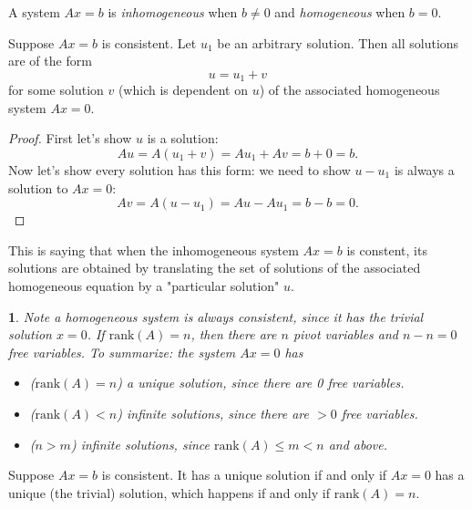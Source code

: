 \documentclass[12pt]{article}
\newtheorem{para}[theorem]{}
\begin{document}
\begin{definition}
	A system $Ax=b$ is \emph{inhomogeneous} when $b\neq 0$ and \emph{homogeneous} when $b=0$.
\end{definition}

\begin{proposition}
	Suppose $Ax=b$ is consistent. Let $u_1$ be an arbitrary solution. Then all solutions are of the form 
	\begin{equation*}
		u = u_1+v
	\end{equation*}
	for some solution $v$ (which is dependent on $u$) of the associated homogeneous system $Ax=0$.
\end{proposition}
\begin{proof}
	First let's show $u$ is a solution:
	\begin{equation*}
		Au = A(u_1+v) = Au_1+Av = b+0=b.
	\end{equation*}
	Now let's show every solution has this form: we need to show $u-u_1$ is always a solution to $Ax=0$:
	\begin{equation*}
		Av = A(u-u_1) = Au-Au_1 = b-b=0.
	\end{equation*}
\end{proof}

\begin{remark}
	This is saying that when the inhomogeneous system $Ax=b$ is constent, its solutions are obtained by translating the set of solutions of the associated homogeneous equation by a "particular solution" $u$.
\end{remark}

\begin{para} 
	Note a homogeneous system is always consistent, since it has the trivial solution $x=0$. If $\text{rank}(A)=n$, then there are $n$ pivot variables and $n-n=0$ free variables. To summarize: the system $Ax=0$ has
	\begin{itemize}
		\item ($\text{rank}(A)=n$) a unique solution, since there are 0 free variables.
		\item ($\text{rank}(A)<n$) infinite solutions, since there are $>0$ free variables.
		\item ($n>m$) infinite solutions, since $\text{rank}(A)\leq m < n$ and above.
	\end{itemize}
\end{para}	

\begin{corollary}
	Suppose $Ax=b$ is consistent. It has a unique solution if and only if $Ax=0$ has a unique (the trivial) solution, which happens if and only if $\text{rank}(A)=n$.
\end{corollary}
\end{document}
